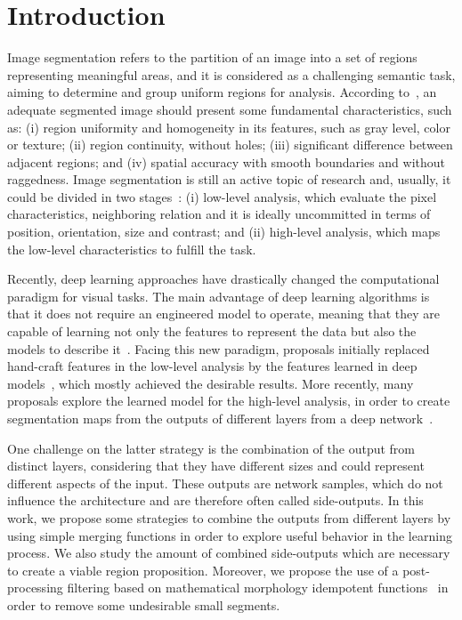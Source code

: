 \section{Introduction}
\label{sec:intro}

Image segmentation refers to the partition of an image into a set of regions representing  meaningful areas, and it is considered as a challenging semantic task, aiming to determine and group uniform regions for analysis. According to~\cite{DOMINGUEZ}, an adequate segmented image should present some fundamental characteristics, such as: (i) region uniformity and homogeneity in  its features, such as gray level, color or texture; (ii) region continuity, without holes; (iii) significant difference between adjacent regions; and (iv) spatial accuracy with smooth boundaries and without raggedness. Image segmentation is still an active topic of research and, usually, it could be divided in two stages~\cite{guigues06}: (i) low-level analysis, which evaluate the pixel characteristics, neighboring relation and it is ideally uncommitted in terms of position, orientation, size and contrast; and (ii) high-level analysis, which maps the low-level characteristics to fulfill the task.  

Recently, deep learning approaches have drastically changed the computational paradigm for visual tasks. The main advantage of deep learning algorithms is that it does not require an engineered model to operate, meaning that they are capable of learning not only the features to represent the data but also the models to describe it~\cite{goodfellow16}. Facing this new paradigm, proposals initially replaced  hand-craft features in the low-level analysis by the features learned in deep models~\cite{farabet2013,simonyan2014,lee2015}, which mostly achieved the desirable results. More recently, many proposals explore the learned model for the high-level analysis, in order to create segmentation maps from the outputs of different layers from a deep network~\cite{xie2017,cheng2016,maninis2017,liu2017}. 

One challenge on the latter strategy is the combination of the output from distinct layers, considering that they have different sizes and could represent different aspects of the input. These outputs are network samples, which do not influence the architecture and are therefore often called side-outputs. In this work, we propose some strategies to combine the outputs from different layers by using simple merging functions in order to explore useful behavior in the learning process. We also study the amount of combined side-outputs which are necessary to create a viable region proposition. Moreover, we propose the use of a post-processing filtering based on mathematical morphology idempotent functions~\cite{najman13} in order to remove some undesirable small segments.

